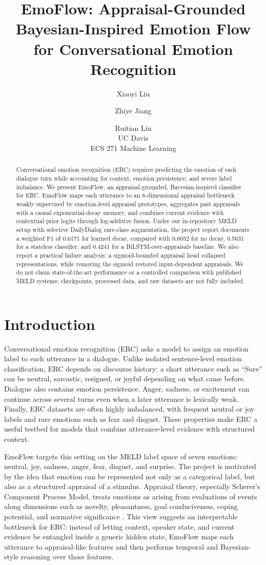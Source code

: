 \documentclass[11pt]{article}
\title{EmoFlow: Appraisal-Grounded Bayesian-Inspired Emotion Flow for Conversational Emotion Recognition}
\author{Xiaoyi Liu \and Zhiye Jiang \and Ruitian Liu \\
  UC Davis \\
  ECS 271 Machine Learning}
\begin{document}
\maketitle

\begin{abstract}
Conversational emotion recognition (ERC) requires predicting the emotion of each dialogue turn while accounting for context, emotion persistence, and severe label imbalance. We present EmoFlow, an appraisal-grounded, Bayesian-inspired classifier for ERC. EmoFlow maps each utterance to an 8-dimensional appraisal bottleneck weakly supervised by emotion-level appraisal prototypes, aggregates past appraisals with a causal exponential-decay memory, and combines current evidence with contextual prior logits through log-additive fusion. Under our in-repository MELD setup with selective DailyDialog rare-class augmentation, the project report documents a weighted F1 of 0.6171 for learned decay, compared with 0.6052 for no decay, 0.5631 for a stateless classifier, and 0.4241 for a BiLSTM-over-appraisals baseline. We also report a practical failure analysis: a sigmoid-bounded appraisal head collapsed representations, while removing the sigmoid restored input-dependent appraisals. We do not claim state-of-the-art performance or a controlled comparison with published MELD systems; checkpoints, processed data, and raw datasets are not fully included.
\end{abstract}

\section{Introduction}

Conversational emotion recognition (ERC) asks a model to assign an emotion label to each utterance in a dialogue. Unlike isolated sentence-level emotion classification, ERC depends on discourse history: a short utterance such as ``Sure'' can be neutral, sarcastic, resigned, or joyful depending on what came before. Dialogue also contains emotion persistence. Anger, sadness, or excitement can continue across several turns even when a later utterance is lexically weak. Finally, ERC datasets are often highly imbalanced, with frequent neutral or joy labels and rare emotions such as fear and disgust. These properties make ERC a useful testbed for models that combine utterance-level evidence with structured context.

EmoFlow targets this setting on the MELD label space of seven emotions: neutral, joy, sadness, anger, fear, disgust, and surprise. The project is motivated by the idea that emotion can be represented not only as a categorical label, but also as a structured appraisal of a stimulus. Appraisal theory, especially Scherer's Component Process Model, treats emotions as arising from evaluations of events along dimensions such as novelty, pleasantness, goal conduciveness, coping potential, and normative significance \citep{scherer2001appraisal}. This view suggests an interpretable bottleneck for ERC: instead of letting context, speaker state, and current evidence be entangled inside a generic hidden state, EmoFlow maps each utterance to appraisal-like features and then performs temporal and Bayesian-style reasoning over those features.
\end{document}
